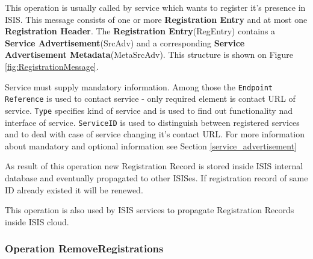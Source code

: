 \documentclass{book}
\begin{document}
This operation is usually called by service which wants to register it's presence in ISIS. This message consists of one or more \textbf{Registration Entry} and at most one \textbf{Registration Header}. The \textbf{Registration Entry}(RegEntry) contains a \textbf{Service Advertisement}(SrcAdv) and a corresponding \textbf{Service Advertisement Metadata}(MetaSrcAdv). This structure is shown on Figure \ref{fig:RegistrationMessage}.
\begin{figure}[ht]
\end{figure}

Service must supply mandatory information. Among those the \texttt{Endpoint Reference} is used to contact service - only required element is contact URL of service. \texttt{Type} specifies kind of service and is used to find out functionality nad interface of service. \texttt{ServiceID} is used to distinguish between registered services and to deal with case of service changing it's contact URL. For more information about mandatory and optional information see Section \ref{service_advertisement}

As result of this operation new Registration Record is stored inside ISIS internal database and eventually propagated to other ISISes. If registration record of same ID already existed it will be renewed.

This operation is also used by ISIS services to propagate Registration Records inside ISIS cloud.

\subsubsection{Operation RemoveRegistrations}
\end{document}
